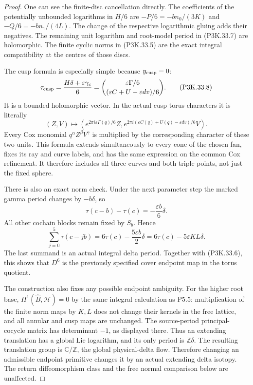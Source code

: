 \begin{proof}
One can see the finite-disc cancellation directly. The coefficients
of the potentially unbounded logarithms in \(H/6\) are
\(-P/6=-bn_0/(3K)\) and
\(-Q/6=-bn_1/(4L)\). The change of the respective logarithmic
gluing adds their negatives. The remaining unit logarithm and
root-model period in (P3K.33.7) are holomorphic. The finite cyclic
norms in (P3K.33.5) are the exact integral compatibility at the
centres of those discs.

The cusp formula is especially simple because \(y_{\rm cusp}=0\):
\[
 \tau_{\rm cusp}
     =\frac{H\delta+\varepsilon\gamma_c}{6}
     =\binom{\varepsilon\Gamma/6}
              {(\varepsilon C+U-\varepsilon dv)/6}.    \tag{P3K.33.8}
\]
It is a bounded holomorphic vector. In the actual cusp torus
characters it is literally
\[
 (Z,V)\longmapsto
 \left(e^{2\pi i\varepsilon\Gamma(q)/6}Z,
       e^{2\pi i(\varepsilon C(q)+U(q)-\varepsilon dv)/6}V\right).
                                                               \tag{P3K.33.9}
\]
Every Cox monomial \(q^\alpha Z^\beta V^\gamma\) is multiplied
by the corresponding character of these two units. This formula
extends simultaneously to every cone of the chosen fan, fixes
its ray and curve labels, and has the same expression on the
common Cox refinement. It therefore includes all three curves
and both triple points, not just the fixed sphere.

There is also an exact norm check. Under the next parameter
step the marked gamma period changes by \(-b\delta\), so
\[
 \tau(c-b)-\tau(c)=-\frac{\varepsilon b}{6}\delta.
\]
All other cochain blocks remain fixed by \(S_b\). Hence
\[
 \sum_{j=0}^5\tau(c-jb)=6\tau(c)-\frac{5\varepsilon b}{2}\delta
                      =6\tau(c)-5\varepsilon KL\delta. \tag{P3K.33.10}
\]
The last summand is an actual integral delta period. Together
with (P3K.33.6), this shows that \(D^6\) is the previously specified
cover endpoint map in the torus quotient.

The construction also fixes any possible endpoint ambiguity.
For the higher root base, \(H^1(\widehat B,\mathcal H)=0\)
by the same integral calculation as P5.5: multiplication of the
finite norm maps by \(K,L\) does not change their kernels in
the free lattice, and all annular and cusp maps are unchanged.
The source-period principal-cocycle matrix has determinant
\(-1\), as displayed there. Thus an extending translation has
a global Lie logarithm, and its only period is \(\mathbb Z\delta\).
The resulting translation group is \(\mathbb C/\mathbb Z\),
the global physical-delta flow. Therefore changing an admissible
endpoint primitive changes it by an actual extending delta
isotopy. The return diffeomorphism class and the free normal
comparison below are unaffected.


\end{proof}

